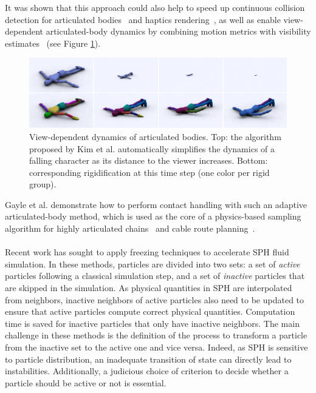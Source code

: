 It was shown that this approach could also help to speed up continuous collision detection for articulated bodies~\cite{Kim2008Collision} and haptics rendering~\cite{Morin2007}, as well as enable view-dependent articulated-body dynamics by combining motion metrics with visibility estimates~\cite{Kim2008View} (see Figure \ref{fig:ViewDependentArticulatedBodies}).
\begin{figure}[!h]
	\includegraphics[width=\linewidth]{./images/starAdaptivity-cgf2016/WMComparisonNoLabels.png}
	\caption[STAR adaptivity: Articulated rigid body freezing]{\label{fig:ViewDependentArticulatedBodies}View-dependent dynamics of articulated bodies. Top: the algorithm proposed by Kim et al. \cite{Kim2008Collision} automatically simplifies the dynamics of a falling character as its distance to the viewer increases. Bottom: corresponding rigidification at this time step (one color per rigid group).}
\end{figure}
Gayle et al. \cite{Gayle2006} demonstrate how to perform contact handling with such an adaptive articulated-body method, which is used as the core of a physics-based sampling algorithm for highly articulated chains~\cite{Gayle2007} and cable route planning~\cite{Kabul2007}.
\paragraph*{}
Recent work has sought to apply freezing techniques to accelerate SPH fluid simulation.
In these methods, particles are divided into two sets: a set of \emph{active} particles following a classical simulation step, and a set of \emph{inactive} particles that are skipped in the simulation.
As physical quantities in SPH are interpolated from neighbors, inactive neighbors of active particles also need to be updated to ensure that active particles compute correct physical quantities.
Computation time is saved for inactive particles that only have inactive neighbors.
The main challenge in these methods is the definition of the process to transform a particle from the inactive set to the active one and vice versa.
Indeed, as SPH is sensitive to particle distribution, an inadequate transition of state can directly lead to instabilities.
Additionally, a judicious choice of criterion to decide whether a particle should be active or not is essential.

